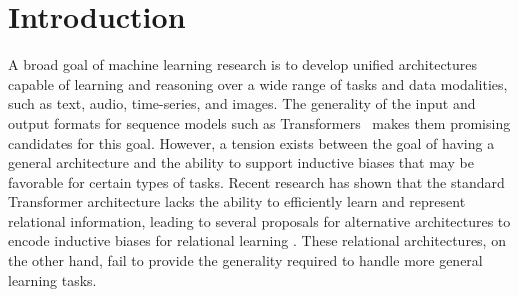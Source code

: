 \section{Introduction}\label{sec:intro}

A broad goal of machine learning research is to develop unified architectures capable of learning and reasoning over a wide range of tasks and data modalities, such as text, audio, time-series, and images. The generality of the input and output formats for sequence models such as Transformers~\citep{vaswani2017attention} makes them promising candidates for this goal. However, a tension exists between the goal of having a general architecture and the ability to support inductive biases that may be favorable for certain types of tasks. Recent research has shown that the standard Transformer architecture lacks the ability to efficiently learn and represent relational information, leading to several proposals for alternative architectures to encode inductive biases for relational learning \citep{santoroSimpleNeuralNetwork2017,santoroRelationalRecurrentNeural2018,shanahanExplicitlyRelationalNeurala,webbEmergentSymbolsBinding2021,kergNeuralArchitectureInductive2022,altabaaLearningHierarchicalRelational2024,altabaa2024abstractors,webbRelationalBottleneckInductive2024}. These relational architectures, on the other hand, fail to provide the generality required to handle more general learning tasks. 

